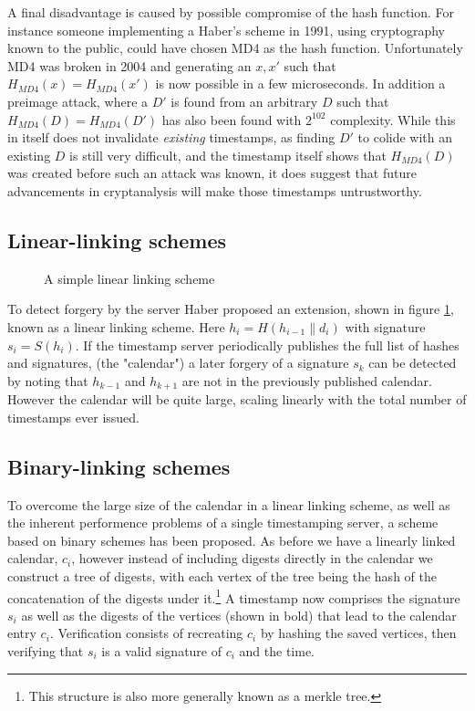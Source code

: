 \documentclass{article}
\begin{document}
A final disadvantage is caused by possible compromise of the hash function. For
instance someone implementing a Haber's scheme in 1991, using cryptography
known to the public, could have chosen MD4 as the hash function. Unfortunately
MD4 was broken in 2004 and generating an $x,x'$ such that
$H_{MD4}(x)=H_{MD4}(x')$ is now possible in a few
microseconds.\cite{Wang05cryptanalysisof} In addition a preimage attack, where
a $D'$ is found from an arbitrary $D$ such that $H_{MD4}(D)=H_{MD4}(D')$ has
also been found with $2^{102}$ complexity.\cite{Leurent_md4is} While this in
itself does not invalidate \emph{existing} timestamps, as finding $D'$ to
colide with an existing $D$ is still very difficult, and the timestamp itself
shows that $H_{MD4}(D)$ was created before such an attack was known, it does
suggest that future advancements in cryptanalysis will make those timestamps
untrustworthy.

\subsection{Linear-linking schemes}

\begin{figure}
    \centering
    
    \caption{A simple linear linking scheme}
    \label{fig:linear-linking-scheme}
\end{figure}

To detect forgery by the server Haber proposed an extension, shown in figure
\ref{fig:linear-linking-scheme}, known as a linear linking
scheme.\cite{Haber91howto} Here $h_i=H(h_{i-1} \| d_i)$ with signature
$s_i=S(h_i)$. If the timestamp server periodically publishes the full list of
hashes and signatures, (the "calendar") a later forgery of a signature $s_k$
can be detected by noting that $h_{k-1}$ and $h_{k+1}$ are not in the
previously published calendar. However the calendar will be quite large,
scaling linearly with the total number of timestamps ever issued.

\subsection{Binary-linking schemes}

To overcome the large size of the calendar in a linear linking scheme, as well
as the inherent performence problems of a single timestamping server, a scheme
based on binary schemes has been proposed.\cite{Buldas98time-stampingwith} As
before we have a linearly linked calendar, $c_i$, however instead of including
digests directly in the calendar we construct a tree of digests, with each
vertex of the tree being the hash of the concatenation of the digests under
it.\footnote{This structure is also more generally known as a merkle tree.\cite{merkle87}} A
timestamp now comprises the signature $s_i$ as well as the digests of the
vertices (shown in bold) that lead to the calendar entry $c_i$.  Verification
consists of recreating $c_i$ by hashing the saved vertices, then verifying
that $s_i$ is a valid signature of $c_i$ and the time.
\end{document}
